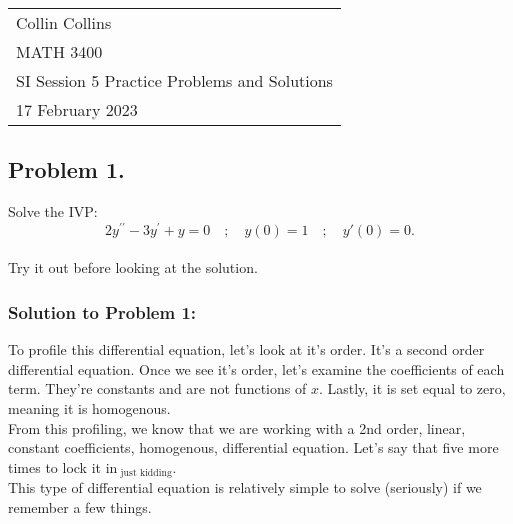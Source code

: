 \documentclass[a4paper,12pt]{article}
\begin{document}

\thispagestyle{empty}

\begin{tabular}{p{15.5cm}}
\\ Collin Collins \\
MATH 3400\\
SI Session 5 Practice Problems and Solutions\\
17 February 2023 \\
\hline

\end{tabular} 

\subsection*{Problem 1.} 
Solve the IVP:
$$2 y^{\prime \prime}-3 y^{\prime}+y=0 \quad ; \quad y(0)=1 \quad ; \quad y'(0)=0.$$
\\
 
Try it out before looking at the solution.
\pagebreak

\subsubsection*{Solution to Problem 1:}
To profile this differential equation, let's look at it's order. It's a second order differential equation. Once we see it's order, let's examine the coefficients of each term. They're constants and are not functions of $x$. Lastly, it is set equal to zero, meaning it is homogenous.\\

From this profiling, we know that we are working with a 2nd order, linear, constant coefficients, homogenous, differential equation. Let's say that five more times to lock it in$_{\text{ just kidding}}$.\\

This type of differential equation is relatively simple to solve (seriously) if we remember a few things.
\end{document}

